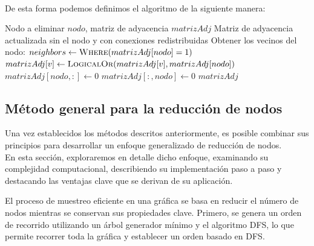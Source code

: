 \\De esta forma podemos definimos el algoritmo de la siguiente manera:
\begin{algorithm}[H]
\caption{Eliminar Nodo con Redistribución de Adyacencias}
\label{alg:elimnaAdyacencias}
\begin{algorithmic}[1]
\Require Nodo a eliminar $nodo$, matriz de adyacencia $matrizAdj$
\Ensure Matriz de adyacencia actualizada sin el nodo y con conexiones redistribuidas
\Statex
{}
    \State Obtener los vecinos del nodo: $neighbors \gets \textsc{Where}(matrizAdj[nodo] = 1)$
        \State $matrizAdj[v] \gets \textsc{LogicalOr}(matrizAdj[v], matrizAdj[nodo])$
    \EndFor
    \State $matrizAdj[nodo, :] \gets 0$
    \State $matrizAdj[:, nodo] \gets 0$
    \State \Return $matrizAdj$
\EndFunction
\end{algorithmic}
\end{algorithm}

\subsection{Método general para la reducción de nodos}

Una vez establecidos los métodos descritos anteriormente, es posible combinar sus principios para desarrollar un enfoque generalizado de reducción de nodos. 
\\En esta sección, exploraremos en detalle dicho enfoque, examinando su complejidad computacional, describiendo su implementación paso a paso y destacando las ventajas clave que se derivan de su aplicación.

El proceso de muestreo eficiente en una gráfica se basa en reducir el número de nodos mientras se conservan sus propiedades clave. Primero, se genera un orden de recorrido utilizando un árbol generador mínimo y el algoritmo DFS, lo que permite recorrer toda la gráfica y establecer un orden basado en DFS.

